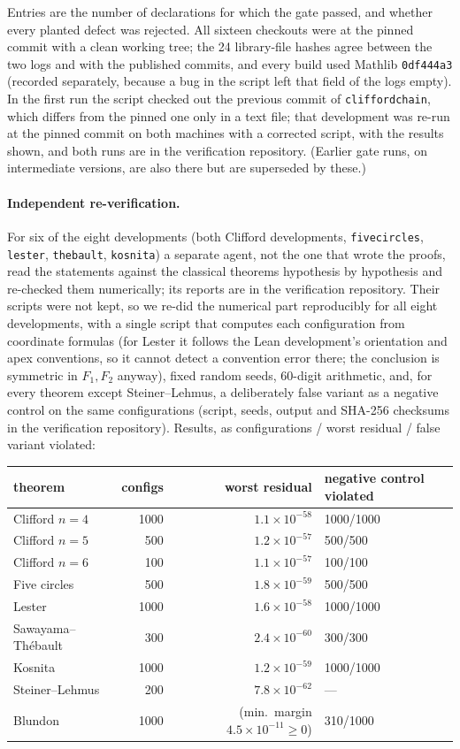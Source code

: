 \documentclass[11pt]{article}
\theoremstyle{definition}
\theoremstyle{remark}
\newcommand{\lean}[1]{\texttt{#1}}
\begin{document}
Entries are the number of declarations for which the gate passed, and whether every planted defect was
rejected. All sixteen checkouts were at the pinned commit with a clean working tree; the 24 library-file hashes
agree between the two logs and with the published commits, and every build used Mathlib
\texttt{0df444a3} (recorded separately, because a bug in the script left that field of the logs
empty). In the first run the script checked out the previous commit of \lean{cliffordchain}, which
differs from the pinned one only in a text file; that development was re-run at the pinned commit on
both machines with a corrected script, with the results shown, and both runs are in the verification repository. (Earlier gate runs, on intermediate versions, are also there but are superseded by these.)

\paragraph{Independent re-verification.} For six of the eight developments (both Clifford
developments, \lean{fivecircles}, \lean{lester}, \lean{thebault}, \lean{kosnita}) a separate agent, not
the one that wrote the proofs, read the statements against the classical theorems hypothesis by
hypothesis and re-checked them numerically; its reports are in the verification repository. Their scripts were not kept, so
we re-did the numerical part reproducibly for all eight developments, with a single script that computes each configuration from coordinate formulas (for Lester it
follows the Lean development's orientation and apex conventions, so it cannot detect a convention
error there; the conclusion is symmetric in $F_1,F_2$ anyway), fixed random seeds, 60-digit
arithmetic, and, for every theorem except Steiner--Lehmus, a deliberately false variant as a negative
control on the same configurations (script,
seeds, output and SHA-256 checksums in the verification repository). Results, as configurations / worst residual /
false variant violated:
\begin{center}\small
\begin{tabular}{lrrl}
\toprule
theorem & configs & worst residual & negative control violated\\
\midrule
Clifford $n=4$ & 1000 & $1.1\times10^{-58}$ & 1000/1000\\
Clifford $n=5$ & 500 & $1.2\times10^{-57}$ & 500/500\\
Clifford $n=6$ & 100 & $1.1\times10^{-57}$ & 100/100\\
Five circles & 500 & $1.8\times10^{-59}$ & 500/500\\
Lester & 1000 & $1.6\times10^{-58}$ & 1000/1000\\
Sawayama--Th\'ebault & 300 & $2.4\times10^{-60}$ & 300/300\\
Kosnita & 1000 & $1.2\times10^{-59}$ & 1000/1000\\
Steiner--Lehmus & 200 & $7.8\times10^{-62}$ & ---\\
Blundon & 1000 & (min.\ margin $4.5\times10^{-11}\ge0$) & 310/1000\\
\bottomrule
\end{tabular}
\end{center}
\end{document}
